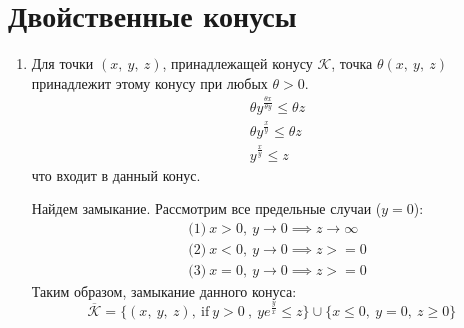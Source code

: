 \documentclass{article}
\begin{document}
\section{Двойственные конусы}
\begin{enumerate}
    \item Для точки $(x, \ y, \ z)$, принадлежащей конусу $\mathcal{K}$, точка $\theta (x, \ y, \ z)$ принадлежит этому конусу при любых $\theta > 0$.
          \begin{align*}
               & \theta y^{\frac{\theta x}{\theta y}} \leq \theta z \\
               & \theta y^{\frac{x}{y}} \leq \theta z               \\
               & y^{\frac{x}{y}} \leq z
          \end{align*}
          что входит в данный конус.

          Найдем замыкание.
          Рассмотрим все предельные случаи ($y = 0$):
          \begin{align*}
               & \text{(1)} \ x > 0, \ y \to 0 \implies z \to \infty \\
               & \text{(2)} \ x < 0, \ y \to 0 \implies z >= 0       \\
               & \text{(3)} \ x = 0, \ y \to 0 \implies z >= 0
          \end{align*}
          Таким образом, замыкание данного конуса:
          \[
              \overline{\mathcal{K}} = \{(x, \ y, \ z), \ \text{if} \ y > 0 \ , \ ye^{\frac{y}{x}} \leq z\} \cup \{x \leq 0, \ y = 0, \ z \geq 0\}
          \]


\end{enumerate}
\end{document}
